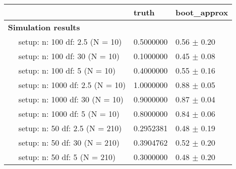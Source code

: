 \documentclass{article}
\begin{document}
\begin{tabular}{l|l|l}
    \hline
     & truth & boot_approx\\
    \hline
    \bf{Simulation results} & ~ & ~\\
    \hline
    ~~ setup: n: 100 df: 2.5 (N = 10) & 0.5000000 & 0.56 $\pm$ 0.20\\
    \hline
    ~~ setup: n: 100 df: 30 (N = 10) & 0.1000000 & 0.45 $\pm$ 0.08\\
    \hline
    ~~ setup: n: 100 df: 5 (N = 10) & 0.4000000 & 0.55 $\pm$ 0.16\\
    \hline
    ~~ setup: n: 1000 df: 2.5 (N = 10) & 1.0000000 & 0.88 $\pm$ 0.05\\
    \hline
    ~~ setup: n: 1000 df: 30 (N = 10) & 0.9000000 & 0.87 $\pm$ 0.04\\
    \hline
    ~~ setup: n: 1000 df: 5 (N = 10) & 0.8000000 & 0.84 $\pm$ 0.06\\
    \hline
    ~~ setup: n: 50 df: 2.5 (N = 210) & 0.2952381 & 0.48 $\pm$ 0.19\\
    \hline
    ~~ setup: n: 50 df: 30 (N = 210) & 0.3904762 & 0.52 $\pm$ 0.20\\
    \hline
    ~~ setup: n: 50 df: 5 (N = 210) & 0.3000000 & 0.48 $\pm$ 0.20\\
    \hline
    \end{tabular}
\end{document}
